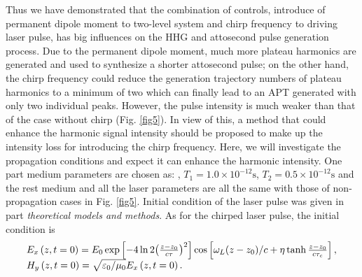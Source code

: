 \documentclass[10pt,letterpaper]{article}
\begin{document}
Thus we have demonstrated that the combination of controls, introduce of permanent dipole moment to two-level system and chirp frequency to driving laser pulse, has big influences on the HHG and attosecond pulse generation process. Due to the permanent dipole moment, much more plateau harmonics are generated and used to synthesize a shorter attosecond pulse; on the other hand, the chirp frequency could reduce the generation trajectory numbers of plateau harmonics to a minimum of two which can finally lead to an APT generated with only two individual peaks. However, the pulse intensity is much weaker than that of the case without chirp (Fig. \ref{fig5}). In view of this, a method that could enhance the harmonic signal intensity should be proposed to make up the intensity loss for introducing the chirp frequency. Here, we will investigate the propagation conditions and expect it can enhance the harmonic intensity. One part medium parameters are chosen as: , $ T_{1}=1.0\times10^{-12} \textrm{s} $, $ T_{2}=0.5\times10^{-12} \textrm{s} $ \cite{Kalosha-Two-Level-PRL-1999} and the rest medium and all the laser parameters are all the same with those of non-propagation cases in Fig. \ref{fig5}. Initial condition of the laser pulse was given in part \emph{theoretical models and methods}. As for the chirped laser pulse, the initial condition is
\begin{equation}
\begin{array}{l}
{E_x}\left( {z,t = 0} \right) = {E_0}\exp \left[ { - 4\ln 2{{\left( {\frac{{z - {z_0}}}{{c\tau }}} \right)}^2}} \right]\cos \left[ {{\omega _L}{{\left( {z - {z_0}} \right)} \mathord{\left/
			{\vphantom {{\left( {z - {z_0}} \right)} c}} \right.
			\kern-\nulldelimiterspace} c} + \eta \tanh \frac{{z - {z_0}}}{{c{\tau _c}}}} \right],\\
{H_y}\left( {z,t = 0} \right) = \sqrt {{{{\varepsilon _0}} \mathord{\left/
			{\vphantom {{{\varepsilon _0}} {{\mu _0}}}} \right.
			\kern-\nulldelimiterspace} {{\mu _0}}}} {E_x}\left( {z,t = 0} \right).
\end{array}
\label{eq20}
\end{equation}
\end{document}
